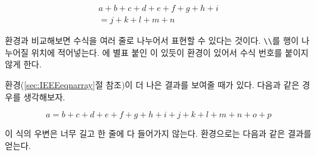 \begin{examplek}
\begin{multline}
  a + b + c + d + e + f 
  + g + h + i  
  \\
  = j + k + l + m + n 
\end{multline}
\end{examplek}
\noindent {} 환경과 비교해보면 수식을 여러 줄로 나누어서 표현할 수 있다는 것이다.
\verb|\\|를 행이 나누어질 위치에 적어넣는다. 에 별표 붙인 이 있듯이 
 환경이 있어서 수식 번호를 붙이지 않게 한다.

 환경(\ref{sec:IEEEeqnarray}절 참조)이 
더 나은 결과를 보여줄 때가 있다. 다음과 같은 경우를 생각해보자.
\begin{examplek}
\begin{equation}
  a = b + c + d + e + f 
  + g + h + i + j 
  + k + l + m + n + o + p  
  \label{eq:equation_too_long}
\end{equation}
\end{examplek}
\noindent 이 식의 우변은 너무 길고 한 줄에 다 들어가지 않는다.  환경으로는 다음과 같은
결과를 얻는다.

